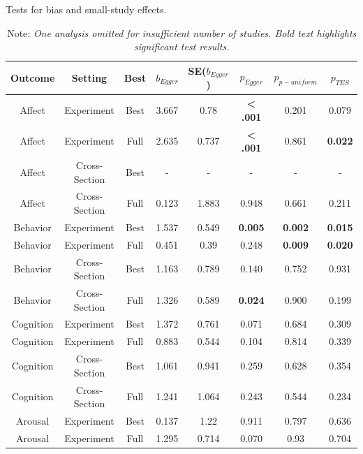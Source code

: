 \documentclass[man]{apa6}
\begin{document}
\begin{table}[htbp]
	\centering
	\caption{Tests for bias and small-study effects.}
	\begin{tabular}{cccccccc}
		\toprule
		Outcome & Setting & Best  & $b_{Egger}$ & SE($b_{Egger}$) & $p_{Egger}$ & $p_{p-uniform}$ & $p_{TES}$ \\
		\midrule
		Affect & Experiment & Best  & 3.667 & 0.78  & \textbf{< .001} & 0.201 & 0.079 \\
		Affect & Experiment & Full  & 2.635 & 0.737 & \textbf{< .001} & 0.861 & \textbf{0.022} \\
		Affect & Cross-Section & Best  & -     & -     & -     & -     & - \\
		Affect & Cross-Section & Full  & 0.123 & 1.883 & 0.948 & 0.661 & 0.211 \\
		Behavior & Experiment & Best  & 1.537 & 0.549 & \textbf{0.005} & \textbf{0.002} & \textbf{0.015} \\
		Behavior & Experiment & Full  & 0.451 & 0.39  & 0.248 & \textbf{0.009} & \textbf{0.020} \\
		Behavior & Cross-Section & Best  & 1.163 & 0.789 & 0.140  & 0.752 & 0.931 \\
		Behavior & Cross-Section & Full  & 1.326 & 0.589 & \textbf{0.024} & 0.900   & 0.199 \\
		Cognition & Experiment & Best  & 1.372 & 0.761 & 0.071 & 0.684 & 0.309 \\
		Cognition & Experiment & Full  & 0.883 & 0.544 & 0.104 & 0.814 & 0.339 \\
		Cognition & Cross-Section & Best  & 1.061 & 0.941 & 0.259 & 0.628 & 0.354 \\
		Cognition & Cross-Section & Full  & 1.241 & 1.064 & 0.243 & 0.544 & 0.234 \\
		Arousal & Experiment & Best  & 0.137 & 1.22  & 0.911 & 0.797 & 0.636 \\
		Arousal & Experiment & Full  & 1.295 & 0.714 & 0.070  & 0.93  & 0.704 \\
		\bottomrule
	\end{tabular}%
	\label{table:Egger}%
	\caption*{Note: {\em One analysis omitted for insufficient number of studies. Bold text highlights significant test results.
			}}
\end{table}%
\end{document}
